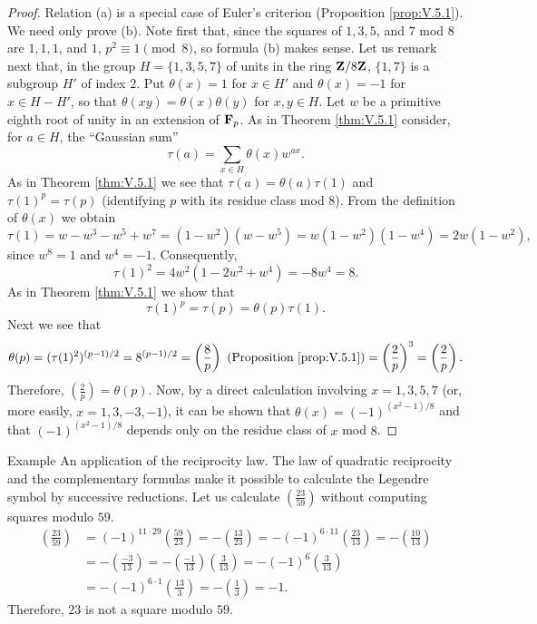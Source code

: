 \begin{proof}
Relation (a) is a special case of Euler's criterion (Proposition
\ref{prop:V.5.1}). We need only prove (b). Note first that, since the
squares of $1,3,5$, and $7$ mod $8$ are $1,1,1$, and $1$, $p^{2}\equiv1
\pmod8$, so formula (b) makes sense. Let us remark next that, in the group
$H=\{1,3,5,7\}$ of units in the ring $\mathbf{Z}/8\mathbf{Z}$, $\{1,7\}$ is a subgroup $H'$
of index $2$. Put $\theta(x)=1$ for $x\in H'$ and $\theta(x)=-1$ for
$x\in H-H'$, so that $\theta(xy)=\theta(x)\theta(y)$ for $x,y\in H$. Let $w$
be a primitive eighth root of unity in an extension of $\mathbf{F}_{p}$. As in
Theorem \ref{thm:V.5.1} consider, for $a\in H$, the ``Gaussian sum''
\begin{equation}
\tau(a)=\sum_{x\in H}\theta(x)w^{ax}.
\label{eq:V.5.7}
\end{equation}
As in Theorem \ref{thm:V.5.1} we see that $\tau(a)=\theta(a)\tau(1)$ and
$\tau(1)^{p}=\tau(p)$ (identifying $p$ with its residue class mod $8$). From
the definition of $\theta(x)$ we obtain
\[
\tau(1)=w-w^{3}-w^{5}+w^{7}=(1-w^{2})(w-w^{5})
=w(1-w^{2})(1-w^{4})=2w(1-w^{2}),
\]
since $w^{8}=1$ and $w^{4}=-1$. Consequently,
\[
\tau(1)^{2}=4w^{2}(1-2w^{2}+w^{4})=-8w^{4}=8.
\]
As in Theorem \ref{thm:V.5.1} we show that
\[
\tau(1)^{p}=\tau(p)=\theta(p)\tau(1).
\]
Next we see that
\[
\theta(p)=(\tau(1)^{2})^{(p-1)/2}=8^{(p-1)/2}
=\left(\frac{8}{p}\right)\ \text{(Proposition \ref{prop:V.5.1})}
=\left(\frac{2}{p}\right)^{3}=\left(\frac{2}{p}\right).
\]
Therefore, $\left(\frac{2}{p}\right)=\theta(p)$. Now, by a direct
calculation involving $x=1,3,5,7$ (or, more easily, $x=1,3,-3,-1$), it can
be shown that $\theta(x)=(-1)^{(x^{2}-1)/8}$ and that
$(-1)^{(x^{2}-1)/8}$ depends only on the residue class of $x$ mod $8$.
\end{proof}

\begin{statement}{Example}
An application of the reciprocity law. The law of quadratic
reciprocity and the complementary formulas make it possible to calculate
the Legendre symbol by successive reductions. Let us calculate
$\left(\frac{23}{59}\right)$ without computing squares modulo $59$.
\[
\begin{aligned}
\left(\frac{23}{59}\right)
&=(-1)^{11\cdot29}\left(\frac{59}{23}\right)
=-\left(\frac{13}{23}\right)
=-(-1)^{6\cdot11}\left(\frac{23}{13}\right)
=-\left(\frac{10}{13}\right)\\
&=-\left(\frac{-3}{13}\right)
=-\left(\frac{-1}{13}\right)\left(\frac{3}{13}\right)
=-(-1)^{6}\left(\frac{3}{13}\right)\\
&=-(-1)^{6\cdot1}\left(\frac{13}{3}\right)
=-\left(\frac{1}{3}\right)=-1.
\end{aligned}
\]
Therefore, $23$ is not a square modulo $59$.
\end{statement}

